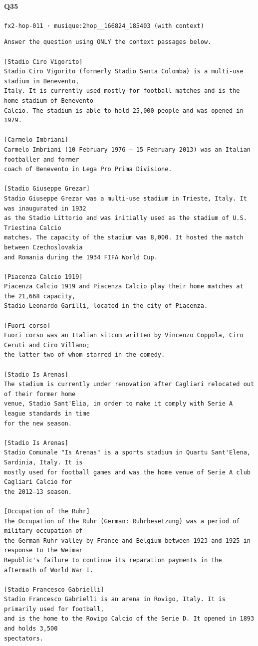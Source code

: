 \documentclass[10pt]{article}
\begin{document}
\paragraph{Q35} \texttt{fx2-hop-011  ·  musique:2hop\_\_166824\_185403 (with context)}
\begin{verbatim}
Answer the question using ONLY the context passages below.

[Stadio Ciro Vigorito]
Stadio Ciro Vigorito (formerly Stadio Santa Colomba) is a multi-use stadium in Benevento,
Italy. It is currently used mostly for football matches and is the home stadium of Benevento
Calcio. The stadium is able to hold 25,000 people and was opened in 1979.

[Carmelo Imbriani]
Carmelo Imbriani (10 February 1976 – 15 February 2013) was an Italian footballer and former
coach of Benevento in Lega Pro Prima Divisione.

[Stadio Giuseppe Grezar]
Stadio Giuseppe Grezar was a multi-use stadium in Trieste, Italy. It was inaugurated in 1932
as the Stadio Littorio and was initially used as the stadium of U.S. Triestina Calcio
matches. The capacity of the stadium was 8,000. It hosted the match between Czechoslovakia
and Romania during the 1934 FIFA World Cup.

[Piacenza Calcio 1919]
Piacenza Calcio 1919 and Piacenza Calcio play their home matches at the 21,668 capacity,
Stadio Leonardo Garilli, located in the city of Piacenza.

[Fuori corso]
Fuori corso was an Italian sitcom written by Vincenzo Coppola, Ciro Ceruti and Ciro Villano;
the latter two of whom starred in the comedy.

[Stadio Is Arenas]
The stadium is currently under renovation after Cagliari relocated out of their former home
venue, Stadio Sant'Elia, in order to make it comply with Serie A league standards in time
for the new season.

[Stadio Is Arenas]
Stadio Comunale "Is Arenas" is a sports stadium in Quartu Sant'Elena, Sardinia, Italy. It is
mostly used for football games and was the home venue of Serie A club Cagliari Calcio for
the 2012–13 season.

[Occupation of the Ruhr]
The Occupation of the Ruhr (German: Ruhrbesetzung) was a period of military occupation of
the German Ruhr valley by France and Belgium between 1923 and 1925 in response to the Weimar
Republic's failure to continue its reparation payments in the aftermath of World War I.

[Stadio Francesco Gabrielli]
Stadio Francesco Gabrielli is an arena in Rovigo, Italy. It is primarily used for football,
and is the home to the Rovigo Calcio of the Serie D. It opened in 1893 and holds 3,500
spectators.


\end{verbatim}
\end{document}
